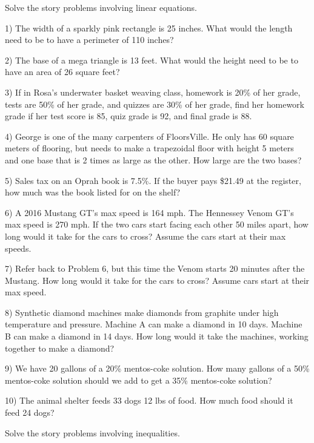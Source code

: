 \documentclass{book}
\theoremstyle{definition}
\begin{document}
Solve the story problems involving linear equations.

\vspace{3mm}

1) The width of a sparkly pink rectangle is 25 inches. What would the length need to be to have a perimeter of 110 inches?

2) The base of a mega triangle is 13 feet. What would the height need to be to have an area of 26 square feet?

3) If in Rosa’s underwater basket weaving class, homework is 20\% of her grade, tests are 50\% of her grade, and quizzes are 30\% of her grade, find her homework grade if her test score is 85, quiz grade is 92, and final grade is 88.

4) George is one of the many carpenters of FloorsVille. He only has 60 square meters of flooring, but needs to make a trapezoidal floor with height 5 meters and one base that is 2 times as large as the other. How large are the two bases?

5) Sales tax on an Oprah book is 7.5\%. If the buyer pays \$21.49 at the register, how much was the book listed for on the shelf?

6) A 2016 Mustang GT’s max speed is 164 mph. The Hennessey Venom GT’s max speed is 270 mph. If the two cars start facing each other 50 miles apart, how long would it take for the cars to cross? Assume the cars start at their max speeds.

7) Refer back to Problem 6, but this time the Venom starts 20 minutes after the Mustang. How long would it take for the cars to cross? Assume cars start at their max speed.

8) Synthetic diamond machines make diamonds from graphite under high temperature and pressure. Machine A can make a diamond in 10 days. Machine B can make a diamond in 14 days. How long would it take the machines, working together to make a diamond?

9) We have 20 gallons of a 20\% mentos-coke solution. How many gallons of a 50\% mentos-coke solution should we add to get a 35\% mentos-coke solution?

10) The animal shelter feeds 33 dogs 12 lbs of food. How much food should it feed 24 dogs?

\vspace{5mm}

Solve the story problems involving inequalities.

\vspace{3mm}
\end{document}
